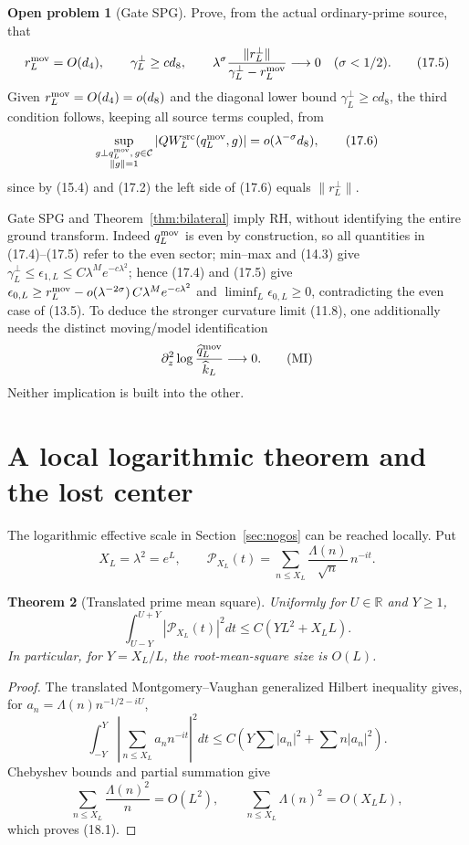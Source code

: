 \documentclass[11pt]{amsart}
\newtheorem{theorem}{Theorem}[section]
\theoremstyle{definition}
\newtheorem{problem}[theorem]{Open problem}
\theoremstyle{remark}
\newcommand{\R}{\mathbb R}
\begin{document}
\begin{problem}[Gate SPG]
\label{prob:spg}
Prove, from the actual ordinary-prime source, that
\[
 r_L^{\rm mov}=O(d_4),
 \qquad
 \gamma_L^\perp\ge c d_8,
 \qquad
 \lambda^\sigma
 \frac{\|r_L^\perp\|}
      {\gamma_L^\perp-r_L^{\rm mov}}
 \longrightarrow0
 \quad(\sigma<1/2).
 \tag{17.5}
\]
Given \(r_L^{\rm mov}=O(d_4)=o(d_8)\) and the diagonal lower bound
\(\gamma_L^\perp\ge cd_8\), the third condition follows, keeping all source
terms coupled, from
\[
 \sup_{\substack{g\perp q_L^{\rm mov},\,g\in\mathcal C\\\|g\|=1}}
 \left|QW_L^{\rm src}(q_L^{\rm mov},g)\right|
 =o(\lambda^{-\sigma}d_8),
 \tag{17.6}
\]
since by (15.4) and (17.2)
the left side of (17.6) equals \(\|r_L^\perp\|\).
\end{problem}

Gate SPG and Theorem~\ref{thm:bilateral} imply RH, without identifying
the entire ground transform.  Indeed \(q_L^{\rm mov}\) is even by construction, so all quantities
in (17.4)--(17.5) refer to the even sector; min--max and
(14.3) give \(\gamma_L^\perp\le\epsilon_{1,L}\le C\lambda^Me^{-c\lambda^2}\);
hence (17.4) and (17.5) give
\(\epsilon_{0,L}\ge r_L^{\rm mov}-o(\lambda^{-2\sigma})
\,C\lambda^Me^{-c\lambda^2}\) and \(\liminf_L\epsilon_{0,L}\ge0\),
contradicting the even case of (13.5).  To deduce the stronger curvature limit (11.8), one additionally
needs the distinct moving/model identification
\[
 \partial_z^2\log
 \frac{\widehat q_L^{\rm mov}}{\widehat k_L}\longrightarrow0.
 \tag{MI}
\]
Neither implication is built into the other.

\section{A local logarithmic theorem and the lost center}
\label{sec:local-log}

The logarithmic effective scale in Section~\ref{sec:nogos} can be reached
locally.  Put
\[
 X_L=\lambda^2=e^L,
 \qquad
 \mathcal P_{X_L}(t)
 =\sum_{n\le X_L}\frac{\Lambda(n)}{\sqrt n}\,n^{-it}.
\]

\begin{theorem}[Translated prime mean square]
\label{thm:mv}
Uniformly for \(U\in\R\) and \(Y\ge1\),
\[
 \boxed{
 \int_{U-Y}^{U+Y}|\mathcal P_{X_L}(t)|^2dt
 \le C(YL^2+X_LL).}
 \tag{18.1}
\]
In particular, for \(Y=X_L/L\), the root-mean-square size is \(O(L)\).
\end{theorem}

\begin{proof}
The translated Montgomery--Vaughan generalized Hilbert inequality
\cite{MV} gives, for \(a_n=\Lambda(n)n^{-1/2-iU}\),
\[
 \int_{-Y}^{Y}\left|\sum_{n\le X_L}a_nn^{-it}\right|^2dt
 \le C\left(Y\sum|a_n|^2+\sum n|a_n|^2\right).
\]
Chebyshev bounds and partial summation give
\[
 \sum_{n\le X_L}\frac{\Lambda(n)^2}{n}=O(L^2),
 \qquad
 \sum_{n\le X_L}\Lambda(n)^2=O(X_LL),
\]
which proves (18.1).
\end{proof}
\end{document}
